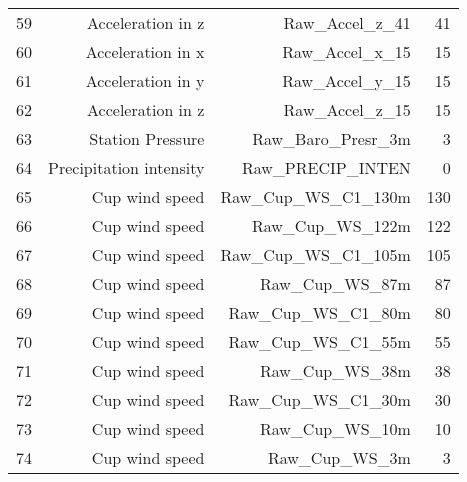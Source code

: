 \begin{longtable}{lrrr}
59 & Acceleration in z & Raw\_Accel\_z\_41 & 41\\
60 & Acceleration in x & Raw\_Accel\_x\_15 & 15\\
61 & Acceleration in y & Raw\_Accel\_y\_15 & 15\\
62 & Acceleration in z & Raw\_Accel\_z\_15 & 15\\
63 & Station Pressure & Raw\_Baro\_Presr\_3m & 3\\
64 & Precipitation intensity & Raw\_PRECIP\_INTEN & 0\\
65 & Cup wind speed & Raw\_Cup\_WS\_C1\_130m & 130\\
66 & Cup wind speed & Raw\_Cup\_WS\_122m & 122\\
67 & Cup wind speed & Raw\_Cup\_WS\_C1\_105m & 105\\
68 & Cup wind speed & Raw\_Cup\_WS\_87m & 87\\
69 & Cup wind speed & Raw\_Cup\_WS\_C1\_80m & 80\\
70 & Cup wind speed & Raw\_Cup\_WS\_C1\_55m & 55\\
71 & Cup wind speed & Raw\_Cup\_WS\_38m & 38\\
72 & Cup wind speed & Raw\_Cup\_WS\_C1\_30m & 30\\
73 & Cup wind speed & Raw\_Cup\_WS\_10m & 10\\
74 & Cup wind speed & Raw\_Cup\_WS\_3m & 3\\
\bottomrule
\end{longtable}